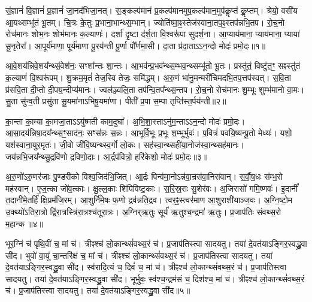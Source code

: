 \setcounter{anuvakam}{0}

   सं॒ज्ञानं॑ वि॒ज्ञानं॑ प्र॒ज्ञानं॑ जा॒नद॑भिजा॒नत्।
   स॒ङ्कल्प॑मानं प्र॒कल्प॑मानमुप॒\-कल्प॑मान॒मुप॑कॢप्तं कॢ॒प्तम्।
   श्रेयो॒ वसी॑य आ॒यथ्सम्भू॑तं भू॒तम्।
   चि॒त्रः के॒तुः प्र॒भाना॒भान्थ्स॒म्भान्।
   ज्योति॑ष्मा॒ꣴ॒स्तेज॑स्वाना॒तप॒ꣴ॒स्तप॑न्नभि॒\-तप\sn{}।
   रो॒च॒नो रोच॑मानः शोभ॒नः शोभ॑मानः क॒ल्याणः॑।
   दर्\mbox{}शा॑ दृ॒ष्टा द॑र्\mbox{}श॒ता वि॒श्वरू॑पा सुदर्\mbox{}श॒ना।
   आ॒प्याय॑माना॒ प्याय॑माना॒ प्याया॑ सू॒नृतेरा᳚।
   आ॒पूर्य॑माणा॒ पूर्य॑माणा पू॒रय॑न्ती पू॒र्णा पौ᳚र्णमा॒सी।
   दा॒ता प्र॑दा॒ताऽऽन॒न्दो मोदः॑ प्रमो॒दः॥१॥

   आ॒वे॒शय॑न्निवे॒शय᳚न्थ्सं॒वेश॑नः॒ सꣳशा᳚न्तः शा॒न्तः।
   आ॒भव॑न्प्र॒\-भव᳚न्थ्\-स॒म्भव॒न्थ्सम्भू॑तो भू॒तः।
   प्रस्तु॑तं॒ विष्टु॑त॒ꣳ॒ सꣴस्तु॑तं क॒ल्याणं॑ वि॒श्वरू॑पम्।
   शु॒क्रम॒मृतं॑ तेज॒स्वि तेजः॒ समि॑द्धम्।
   अ॒रु॒णं भा॑नु॒मन्मरी॑चिमदभि॒तप॒त्तप॑स्वत्।
   स॒वि॒ता प्र॑सवि॒ता दी॒प्तो दी॒पय॒न्दीप्य॑मानः।
   ज्वल॑ञ्ज्वलि॒ता तप॑न्वि॒तप᳚न्थ्स॒न्तप\sn{}।
   रो॒च॒नो रोच॑मानः शु॒म्भूः शुम्भ॑मानो वा॒मः।
   सु॒ता सु॑न्व॒ती प्रसु॑ता सू॒यमा॑नाऽभिषू॒यमा॑णा।
   पीती᳚ प्र॒पा स॒म्पा तृप्ति॑स्त॒र्पय॑न्ती॥२॥

   का॒न्ता का॒म्या का॒मजा॒ताऽऽयु॑ष्मती काम॒दुघा᳚।
   अ॒भि॒शा॒स्ताऽ\-नु॑म॒न्ताऽऽन॒न्दो मोदः॑ प्रमो॒दः।
   आ॒सा॒दय॑न्निषा॒\-दय᳚न्थ्स॒ꣳ॒साद॑नः॒ सꣳस॑न्नः स॒न्नः।
   आ॒भूर्वि॒भूः प्र॒भूः श॒म्भूर्भुवः॑।
   प॒वित्रं॑ पवयि॒ष्यन्पू॒तो मेध्यः॑।
   यशो॒ यश॑स्वाना॒युर॒मृतः॑।
   जी॒वो जी॑वि॒ष्यन्थ्स्व॒र्गो लो॒कः।
   सह॑स्वा॒न्थ्सही॑या॒नोज॑स्वा॒न्थ्सह॑मानः।
   जय॑न्नभि॒जय᳚न्थ्सु॒\-द्रवि॑णो द्रविणो॒दाः।
   आ॒र्द्रप॑वित्रो॒ हरि॑केशो॒ मोदः॑ प्रमो॒दः॥३॥

   अ॒रु॒णो॑ऽरु॒णर॑जाः पु॒ण्डरी॑को विश्व॒जिद॑भि॒जित्।
   आ॒र्द्रः पिन्व॑मा॒नोऽन्न॑वा॒न्रस॑वा॒निरा॑वान्।
   स॒र्वौ॒ष॒धः स॑म्भ॒रो मह॑स्वान्।
   ए॒ज॒त्का जो॑व॒त्काः।
   क्षु॒ल्ल॒काः शि॑पिविष्ट॒काः।
   स॒रि॒स्र॒राः सु॒शेर॑वः।
   अ॒जिरासो॑ गमि॒ष्णवः॑।
   इ॒दानीं᳚ त॒दानी॑मे॒तर्\-\mbox{हि॑} क्षि॒प्रम॑जि॒रम्।
   आ॒शुर्नि॑मे॒षः फ॒णो द्रव॑न्नति॒द्रव।
   त्वर॒ꣴ॒स्त्वर॑माण आ॒शुराशी॑याञ्ज॒वः।
   अ॒ग्नि॒ष्टो॒म उ॒क्थ्यो॑ऽतिरा॒त्रो द्वि॑रा॒त्रस्त्रि॑रा॒त्रश्च॑तूरा॒त्रः।
   अ॒ग्निर्{‌}ऋ॒तुः सूर्य॑ ऋ॒तुश्च॒न्द्रमा॑ ऋ॒तुः।
   प्र॒जाप॑तिः संवथ्स॒रो म॒हान्क॥४॥
   \anuvakamend
   
   भूर॒ग्निं च॑ पृथि॒वीं च॒ मां च॑।
   त्रीꣴश्च॑ लो॒कान्थ्सं॑वथ्स॒रं च॑।
   प्र॒जाप॑तिस्त्वा सादयतु।
   तया॑ दे॒वत॑याऽङ्गिर॒स्वद्ध्रु॒वा सी॑द।
   भुवो॑ वा॒युं चा॒न्तरि॑क्षं च॒ मां च॑।
   त्रीꣴश्च॑ लो॒कान्थ्सं॑वथ्स॒रं च॑।
   प्र॒जाप॑तिस्त्वा सादयतु।
   तया॑ दे॒वत॑याऽङ्गिर॒स्वद्ध्रु॒वा सी॑द।
   स्व॑रादि॒त्यं च॒ दिवं॑ च॒ मां च॑।
   त्रीꣴश्च॑ लो॒कान्थ्सं॑वथ्स॒रं च॑।
   प्र॒जाप॑तिस्त्वा सादयतु।
   तया॑ दे॒वत॑याऽङ्गिर॒स्वद्ध्रु॒वा सी॑द।
   भूर्भुवः॒ स्व॑श्च॒न्द्रम॑सं च॒ दिश॑श्च॒ मां च॑।
   त्रीꣴश्च॑ लो॒कान्थ्सं॑वथ्स॒रं च॑।
   प्र॒जाप॑तिस्त्वा सादयतु।
   तया॑ दे॒वत॑याऽङ्गिर॒स्वद्ध्रु॒वा सी॑द॥५॥
   \anuvakamend
   
